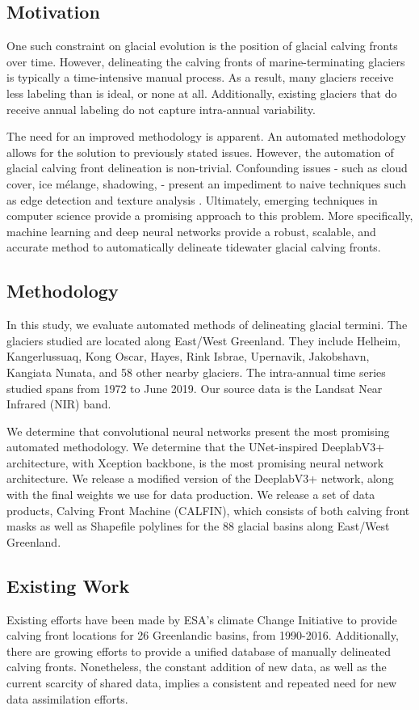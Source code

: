 \documentclass[tc, manuscript]{copernicus}
\begin{document}
\subsection{Motivation}
One such constraint on glacial evolution is the position of glacial calving fronts over time. However, delineating the calving fronts of marine-terminating glaciers is typically a time-intensive manual process. As a result, many glaciers receive less labeling than is ideal, or none at all. Additionally, existing glaciers that do receive annual labeling do not capture intra-annual variability. 

The need for an improved methodology is apparent. An automated methodology allows for the solution to previously stated issues. However, the automation of glacial calving front delineation is non-trivial. Confounding issues - such as cloud cover, ice mélange, shadowing,  - present an impediment to naive techniques such as edge detection \citep{paravolidakis2016} and texture analysis \citep{malik2001}. Ultimately, emerging techniques in computer science provide a promising approach to this problem. More specifically, machine learning and deep neural networks provide a robust, scalable, and accurate method to automatically delineate tidewater glacial calving fronts.

\subsection{Methodology}
In this study, we evaluate automated methods of delineating glacial termini. The glaciers studied are located along East/West Greenland. They include Helheim, Kangerlussuaq, Kong Oscar, Hayes, Rink Isbrae, Upernavik, Jakobshavn, Kangiata Nunata, and 58 other nearby glaciers. The intra-annual time series studied spans from 1972 to June 2019. Our source data is the Landsat Near Infrared (NIR) band.

We determine that convolutional neural networks present the most promising automated methodology. We determine that the UNet-inspired DeeplabV3+ architecture, with Xception backbone, is the most promising neural network architecture. We release a modified version of the DeeplabV3+ network, along with the final weights we use for data production. We release a set of data products, Calving Front Machine (CALFIN), which consists of both calving front masks as well as Shapefile polylines for the 88 glacial basins along East/West Greenland.

\subsection{Existing Work}
Existing efforts have been made by ESA's climate Change Initiative to provide calving front locations for 26 Greenlandic basins, from 1990-2016\citep{enveo2017}. Additionally, there are growing efforts to provide a unified database of manually delineated calving fronts. Nonetheless, the constant addition of new data, as well as the current scarcity of shared data, implies a consistent and repeated need for new data assimilation efforts.
\end{document}
